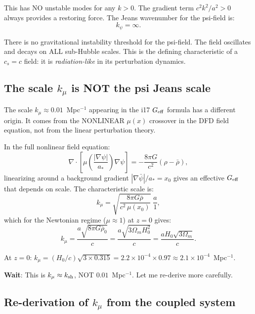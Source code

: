 \documentclass[aps,prd,twocolumn,nofootinbib]{revtex4-2}
\newcommand{\astar}{a_*}
\newcommand{\ee}[1]{\times 10^{#1}}
\newcommand{\Geff}{G_{\rm eff}}
\newcommand{\kmu}{k_\mu}
\newcommand{\kpsi}{k_\psi}
\newcommand{\ksh}{k_{\rm sh}}
\begin{document}
This has NO unstable modes for any $k > 0$. The gradient term
$c^2 k^2/a^2 > 0$ always provides a restoring force. The Jeans
wavenumber for the psi-field is:
\begin{equation}
\boxed{\kpsi = \infty.}
\label{eq:kpsi-inf}
\end{equation}

There is no gravitational instability threshold for the psi-field.
The field oscillates and decays on ALL sub-Hubble scales. This is
the defining characteristic of a $c_s = c$ field: it is
\emph{radiation-like} in its perturbation dynamics.

\subsection{The scale $\kmu$ is NOT the psi Jeans scale}

The scale $\kmu \approx 0.01$~Mpc$^{-1}$ appearing in the i17
$\Geff$ formula has a different origin. It comes from the NONLINEAR
$\mu(x)$ crossover in the DFD field equation, not from the linear
perturbation theory.

In the full nonlinear field equation:
\begin{equation}
\nabla\cdot\left[\mu\!\left(\frac{|\nabla\psi|}{\astar}\right)
\nabla\psi\right] = -\frac{8\pi G}{c^2}(\rho - \bar\rho),
\end{equation}
linearizing around a background gradient $|\nabla\bar\psi|/\astar
= x_0$ gives an effective $\Geff$ that depends on scale. The
characteristic scale is:
\begin{equation}
\kmu = \sqrt{\frac{8\pi G\bar\rho}{c^2\,\mu(x_0)}}\;\frac{a}{1},
\end{equation}
which for the Newtonian regime ($\mu \approx 1$) at $z = 0$ gives:
\begin{equation}
\kmu = \frac{a\sqrt{8\pi G\bar\rho_0}}{c}
= \frac{a\sqrt{3\Omega_m H_0^2}}{c}
= \frac{aH_0\sqrt{3\Omega_m}}{c}.
\end{equation}

At $z = 0$: $\kmu = (H_0/c)\sqrt{3\times 0.315}
= 2.2\ee{-4}\times 0.97 \approx 2.1\ee{-4}$~Mpc$^{-1}$.

\textbf{Wait}: This is $\kmu \approx \ksh$, NOT $0.01$~Mpc$^{-1}$.
Let me re-derive more carefully.

\subsection{Re-derivation of $\kmu$ from the coupled system}
\end{document}

